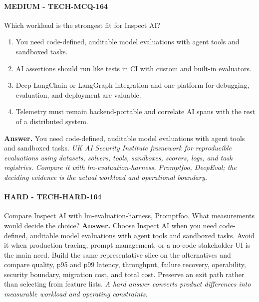 \paragraph{MEDIUM - TECH-MCQ-164} Which workload is the strongest fit for Inspect AI?
\begin{enumerate}[label=\Alph*.]
\item You need code-defined, auditable model evaluations with agent tools and sandboxed tasks.
\item AI assertions should run like tests in CI with custom and built-in evaluators.
\item Deep LangChain or LangGraph integration and one platform for debugging, evaluation, and deployment are valuable.
\item Telemetry must remain backend-portable and correlate AI spans with the rest of a distributed system.
\end{enumerate}
\textbf{Answer.} You need code-defined, auditable model evaluations with agent tools and sandboxed tasks.
\textit{UK AI Security Institute framework for reproducible evaluations using datasets, solvers, tools, sandboxes, scorers, logs, and task registries. Compare it with lm-evaluation-harness, Promptfoo, DeepEval; the deciding evidence is the actual workload and operational boundary.}
\paragraph{HARD - TECH-HARD-164} Compare Inspect AI with lm-evaluation-harness, Promptfoo. What measurements would decide the choice?
\textbf{Answer.} Choose Inspect AI when you need code-defined, auditable model evaluations with agent tools and sandboxed tasks. Avoid it when production tracing, prompt management, or a no-code stakeholder UI is the main need. Build the same representative slice on the alternatives and compare quality, p95 and p99 latency, throughput, failure recovery, operability, security boundary, migration cost, and total cost. Preserve an exit path rather than selecting from feature lists.
\textit{A hard answer converts product differences into measurable workload and operating constraints.}
